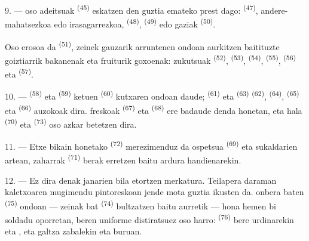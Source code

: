 9. ---  oso adeitsuak \textsuperscript{(45)} eskatzen den
guztia emateko prest dago:  \textsuperscript{(47)},
andere-mahatsezkoa edo irasagarrezkoa, 
\textsuperscript{(48)},  \textsuperscript{(49)} edo
 gaziak \textsuperscript{(50)}.

Oso erosoa da  \textsuperscript{(51)}, zeinek gauzarik
arruntenen ondoan aurkitzen baitituzte goiztiarrik bakanenak eta fruiturik
goxoenak:  zukutsuak \textsuperscript{(52)}, 
\textsuperscript{(53)},  \textsuperscript{(54)},
 \textsuperscript{(55)}, 
\textsuperscript{(56)} eta  \textsuperscript{(57)}.

\VUsaut{4.0mm}
\VUsaut{3.0mm}

10. ---  \textsuperscript{(58)} eta 
\textsuperscript{(59)}  ketuen \textsuperscript{(60)} kutxaren
ondoan daude;  \textsuperscript{(61)} eta 
\textsuperscript{(63)}  \textsuperscript{(62)},
 \textsuperscript{(64)}, 
\textsuperscript{(65)} eta  \textsuperscript{(66)} auzokoak dira.
 freskoak \textsuperscript{(67)} eta 
\textsuperscript{(68)} ere badaude denda honetan, eta hala 
\textsuperscript{(70)} eta  \textsuperscript{(73)} oso azkar
betetzen dira.

11. --- Etxe bikain honetako  \textsuperscript{(72)} merezimenduz da
ospetsua  \textsuperscript{(69)} eta sukaldarien artean,
 zaharrak \textsuperscript{(71)} berak erretzen baitu
ardura handienarekin.

\VUsaut{4.0mm}
\VUsaut{3.0mm}

12. --- Ez dira denak janarien bila etortzen merkatura. Teilapera daraman
kaletxoaren mugimendu pintoreskoan jende mota guztia ikusten da.
 onbera baten \textsuperscript{(75)} ondoan --- zeinak
 bat \textsuperscript{(74)} bultzatzen baitu aurretik --- hona
hemen bi soldadu oporretan, beren uniforme distiratsuez oso harro:
 \textsuperscript{(76)} bere  urdinarekin eta
, eta  galtza zabalekin eta
 buruan.

